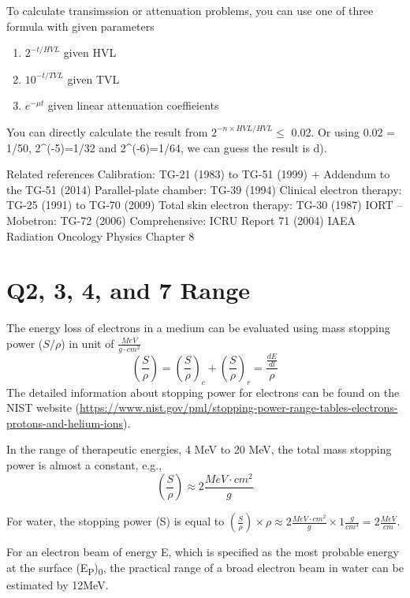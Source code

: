 \documentclass[]{book}
\providecommand{\tightlist}{%
  \setlength{\itemsep}{0pt}\setlength{\parskip}{0pt}}
\theoremstyle{definition}
\theoremstyle{definition}
\theoremstyle{definition}
\theoremstyle{remark}
\begin{document}
To calculate transimssion or attenuation problems, you can use one of
three formula with given parameters

\begin{enumerate}
\def\labelenumi{\arabic{enumi}.}
\tightlist
\item
  \(2^{-t/HVL}\) given HVL
\item
  \(10^{-t/TVL}\) given TVL
\item
  \(e^{-\mu t}\) given linear attenuation coeffieients
\end{enumerate}

You can directly calculate the result from \(2^{-n\times HVL/HVL} \leq\)
0.02. Or using 0.02 = 1/50, 2\^{}(-5)=1/32 and 2\^{}(-6)=1/64, we can
guess the result is d).

Related references Calibration: TG-21 (1983) to TG-51 (1999) + Addendum
to the TG-51 (2014) Parallel-plate chamber: TG-39 (1994) Clinical
electron therapy: TG-25 (1991) to TG-70 (2009) Total skin electron
therapy: TG-30 (1987) IORT -- Mobetron: TG-72 (2006) Comprehensive: ICRU
Report 71 (2004) IAEA Radiation Oncology Physics Chapter 8

\section{Q2, 3, 4, and 7 Range}\label{q2-3-4-and-7-range}

The energy loss of electrons in a medium can be evaluated using mass
stopping power (\(S/\rho\)) in unit of \(\frac{MeV}{g\cdot cm^2}\)
\[ \left(\frac{S}{\rho}\right) =\left(\frac{S}{\rho} \right)_c +\left(\frac{S}{\rho} \right)_r=\frac{\frac{dE}{dl}} {\rho}\]
The detailed information about stopping power for electrons can be found
on the NIST website
(\url{https://www.nist.gov/pml/stopping-power-range-tables-electrons-protons-and-helium-ions}).

In the range of therapeutic energies, 4 MeV to 20 MeV, the total mass
stopping power is almost a constant, e.g.,
\[\left(\frac{S}{\rho}\right) \approx 2 \frac{MeV\cdot {cm}^2}{g}\]

For water, the stopping power (S) is equal to
\(\left(\frac{S}{\rho}\right) \times \rho \approx 2 \frac{MeV\cdot {cm}^2}{g}\times 1 \frac{g}{cm^3} = 2 \frac{MeV}{cm}\).

For an electron beam of energy E, which is specified as the most
probable energy at the surface (E\textsubscript{P})\textsubscript{0},
the practical range of a broad electron beam in water can be estimated
by 12MeV.
\end{document}
